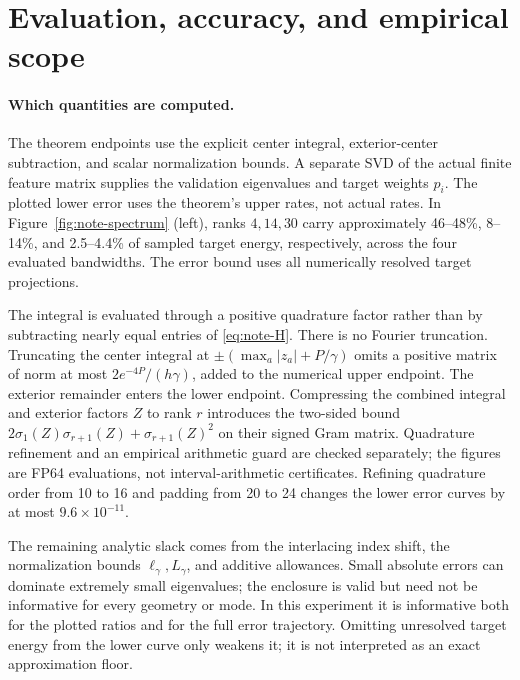 \section{Evaluation, accuracy, and empirical scope}
\label{app:note-evaluation}

\paragraph{Which quantities are computed.}
The theorem endpoints use the explicit center integral, exterior-center
subtraction, and scalar normalization bounds. A separate SVD of the actual
finite feature matrix supplies the validation eigenvalues and target weights
$p_i$. The plotted lower error uses the theorem's upper rates, not actual
rates. In Figure~\ref{fig:note-spectrum} (left), ranks $4,14,30$ carry approximately
46--48\%, 8--14\%, and 2.5--4.4\% of sampled target energy, respectively,
across the four evaluated bandwidths. The error bound uses all numerically
resolved target projections.

The integral is evaluated through a positive quadrature factor rather than
by subtracting nearly equal entries of \eqref{eq:note-H}. There is no Fourier
truncation. Truncating the center integral at
$\pm(\max_a|z_a|+P/\gamma)$ omits a positive matrix of norm at most
$2e^{-4P}/(h\gamma)$, added to the numerical upper endpoint.
The exterior remainder enters the lower endpoint. Compressing the combined
integral and exterior factors $Z$ to rank $r$ introduces the two-sided bound
$2\sigma_1(Z)\sigma_{r+1}(Z)+\sigma_{r+1}(Z)^2$ on their signed Gram matrix.
Quadrature refinement and an empirical arithmetic guard are checked
separately; the figures are FP64 evaluations, not interval-arithmetic
certificates. Refining quadrature order from 10 to 16 and padding from
20 to 24 changes the lower error curves by at most $9.6\times10^{-11}$.

The remaining analytic slack comes from the interlacing index shift, the
normalization bounds $\ell_\gamma,L_\gamma$, and additive allowances.
Small absolute errors can dominate extremely small eigenvalues; the
enclosure is valid but need not be informative for every geometry or mode.
In this experiment it is informative both for the plotted ratios and for
the full error trajectory. Omitting unresolved target energy from the lower
curve only weakens it; it is not interpreted as an exact approximation floor.

